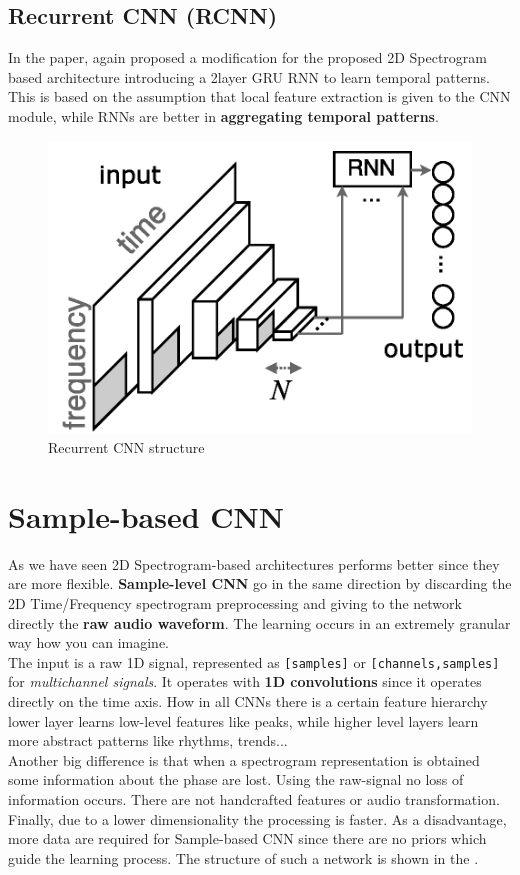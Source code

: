 \subsection{Recurrent CNN (RCNN)}
In the paper, again \citeauthor{choi2017convolutional} proposed a modification for the proposed 2D Spectrogram based architecture introducing a 2layer GRU RNN to learn temporal patterns. This is based on the assumption that local feature extraction is given to the CNN module, while RNNs are better in \textbf{aggregating temporal patterns}.

\begin{figure}[h]
    \centering
    \includegraphics[scale=0.8]{img/CRNN.png}
    \caption{Recurrent CNN structure}
\end{figure}

\section{Sample-based CNN}
As we have seen 2D Spectrogram-based architectures performs better since they are more flexible. \textbf{Sample-level CNN} go in the same direction by discarding the 2D Time/Frequency spectrogram preprocessing and giving to the network directly the \textbf{raw audio waveform}. The learning occurs in an extremely granular way how you can imagine.\\
The input is a raw 1D signal, represented as \texttt{[samples]} or \texttt{[channels,samples]} for \textit{multichannel signals}. It operates with \textbf{1D convolutions} since it operates directly on the time axis. How in all CNNs there is a certain feature hierarchy lower layer learns low-level features like peaks, while higher level layers learn more abstract patterns like rhythms, trends...\\
Another big difference is that when a spectrogram representation is obtained some information about the phase are lost. Using the raw-signal no loss of information occurs. There are not handcrafted features or audio transformation. Finally, due to a lower dimensionality the processing is faster. As a disadvantage, more data are required for Sample-based CNN since there are no priors which guide the learning process. The structure of such a network is shown in the .


